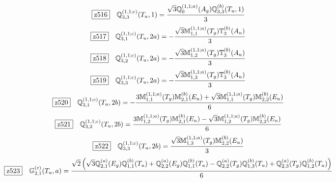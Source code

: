 \documentclass[fleqn,10pt,landscape]{jsarticle}
\begin{document}
\begin{dmath*}
\hspace*{3mm}\fbox{z516}\quad \mathbb{Q}_{3,3}^{(1,1;c)}(T_{u},1)=\frac{\sqrt{3} \mathbb{Q}_{0}^{(1,1;a)}(A_{g}) \mathbb{Q}_{3,3}^{(b)}(T_{u},1)}{3}
\end{dmath*}
\begin{dmath*}
\hspace*{3mm}\fbox{z517}\quad \mathbb{Q}_{3,1}^{(1,1;c)}(T_{u},2a)=- \frac{\sqrt{3} \mathbb{M}_{1,1}^{(1,1;a)}(T_{g}) \mathbb{T}_{3}^{(b)}(A_{u})}{3}
\end{dmath*}
\begin{dmath*}
\hspace*{3mm}\fbox{z518}\quad \mathbb{Q}_{3,2}^{(1,1;c)}(T_{u},2a)=- \frac{\sqrt{3} \mathbb{M}_{1,2}^{(1,1;a)}(T_{g}) \mathbb{T}_{3}^{(b)}(A_{u})}{3}
\end{dmath*}
\begin{dmath*}
\hspace*{3mm}\fbox{z519}\quad \mathbb{Q}_{3,3}^{(1,1;c)}(T_{u},2a)=- \frac{\sqrt{3} \mathbb{M}_{1,3}^{(1,1;a)}(T_{g}) \mathbb{T}_{3}^{(b)}(A_{u})}{3}
\end{dmath*}
\begin{dmath*}
\hspace*{3mm}\fbox{z520}\quad \mathbb{Q}_{3,1}^{(1,1;c)}(T_{u},2b)=- \frac{3 \mathbb{M}_{1,1}^{(1,1;a)}(T_{g}) \mathbb{M}_{2,1}^{(b)}(E_{u}) + \sqrt{3} \mathbb{M}_{1,1}^{(1,1;a)}(T_{g}) \mathbb{M}_{2,2}^{(b)}(E_{u})}{6}
\end{dmath*}
\begin{dmath*}
\hspace*{3mm}\fbox{z521}\quad \mathbb{Q}_{3,2}^{(1,1;c)}(T_{u},2b)=\frac{3 \mathbb{M}_{1,2}^{(1,1;a)}(T_{g}) \mathbb{M}_{2,1}^{(b)}(E_{u}) - \sqrt{3} \mathbb{M}_{1,2}^{(1,1;a)}(T_{g}) \mathbb{M}_{2,2}^{(b)}(E_{u})}{6}
\end{dmath*}
\begin{dmath*}
\hspace*{3mm}\fbox{z522}\quad \mathbb{Q}_{3,3}^{(1,1;c)}(T_{u},2b)=\frac{\sqrt{3} \mathbb{M}_{1,3}^{(1,1;a)}(T_{g}) \mathbb{M}_{2,2}^{(b)}(E_{u})}{3}
\end{dmath*}
\begin{dmath*}
\hspace*{3mm}\fbox{z523}\quad \mathbb{G}_{2,1}^{(c)}(T_{u},a)=\frac{\sqrt{2} \left(\sqrt{3} \mathbb{Q}_{2,1}^{(a)}(E_{g}) \mathbb{Q}_{1,1}^{(b)}(T_{u}) + \mathbb{Q}_{2,2}^{(a)}(E_{g}) \mathbb{Q}_{1,1}^{(b)}(T_{u}) - \mathbb{Q}_{2,2}^{(a)}(T_{g}) \mathbb{Q}_{1,3}^{(b)}(T_{u}) + \mathbb{Q}_{2,3}^{(a)}(T_{g}) \mathbb{Q}_{1,2}^{(b)}(T_{u})\right)}{6}
\end{dmath*}
\end{document}
